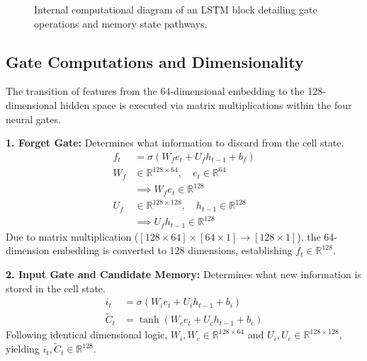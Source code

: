 \documentclass[12pt, a4paper, twocolumn]{article}
\begin{document}
\begin{figure}[h]
{%
}
\caption{Internal computational diagram of an LSTM block detailing gate operations and memory state pathways.}
\label{fig:lstm_cell}
\end{figure}

\subsection{\textbf{Gate Computations and Dimensionality}}
The transition of features from the 64-dimensional embedding to the 128-dimensional hidden space is executed via matrix multiplications within the four neural gates. 

\textbf{1. Forget Gate:}
Determines what information to discard from the cell state.
\begin{align}
    f_t &= \sigma(W_f e_t + U_f h_{t-1} + b_f) \\
    W_f &\in \mathbb{R}^{128 \times 64}, \quad e_t \in \mathbb{R}^{64} \nonumber \\
    &\implies W_f e_t \in \mathbb{R}^{128} \nonumber \\
    U_f &\in \mathbb{R}^{128 \times 128}, \quad h_{t-1} \in \mathbb{R}^{128} \nonumber \\
    &\implies U_f h_{t-1} \in \mathbb{R}^{128} \nonumber
\end{align}
Due to matrix multiplication ($[128 \times 64] \times [64 \times 1] \rightarrow [128 \times 1]$), the 64-dimension embedding is converted to 128 dimensions, establishing $f_t \in \mathbb{R}^{128}$.

\textbf{2. Input Gate and Candidate Memory:}
Determines what new information is stored in the cell state.
\begin{align}
    i_t &= \sigma(W_i e_t + U_i h_{t-1} + b_i) \\
    \tilde{C}_t &= \tanh(W_c e_t + U_c h_{t-1} + b_c)
\end{align}
Following identical dimensional logic, $W_i, W_c \in \mathbb{R}^{128 \times 64}$ and $U_i, U_c \in \mathbb{R}^{128 \times 128}$, yielding $i_t, \tilde{C}_t \in \mathbb{R}^{128}$.
\end{document}
